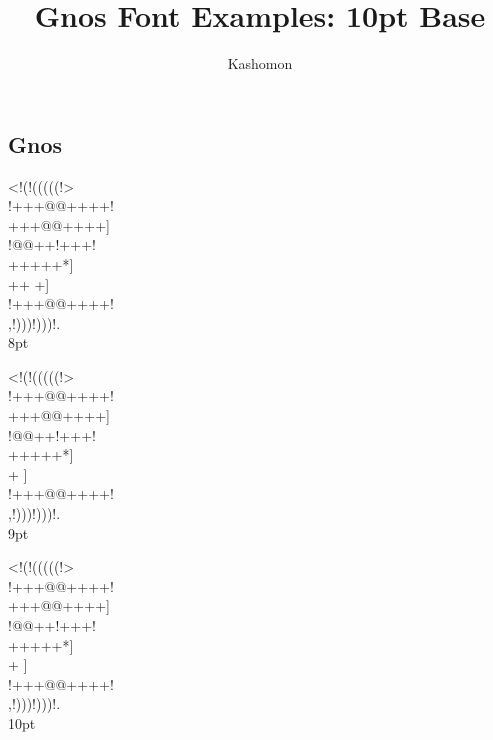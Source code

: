 \documentclass[10pt]{article}
\begin{document}
\title{Gnos Font Examples: 10pt Base}
\author{Kashomon}
\maketitle

\begin{center}
\section*{Gnos}
{
\gnos%
<!(!(((((!>\\
!+++@@++++!\\
+++@@++++]\\
!@@++!+++!\\
+++++*]\\
++
+]\\
!+++@@++++!\\
,!)))!)))!.\\
}
8pt

{
\gnos%
<!(!(((((!>\\
!+++@@++++!\\
+++@@++++]\\
!@@++!+++!\\
+++++*]\\
+
]\\
!+++@@++++!\\
,!)))!)))!.\\
}
9pt


{
\gnos%
<!(!(((((!>\\
!+++@@++++!\\
+++@@++++]\\
!@@++!+++!\\
+++++*]\\
+
]\\
!+++@@++++!\\
,!)))!)))!.\\
}
10pt


\end{center}
\end{document}
